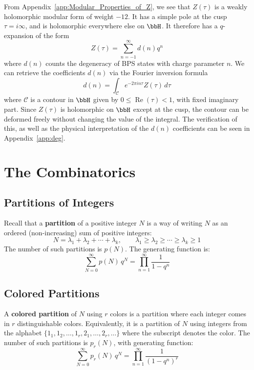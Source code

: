 From Appendix~\ref{app:Modular_Properties_of_Z}, we see that $Z(\tau)$ is a weakly holomorphic modular form of weight $-12$. It has a simple pole at the cusp $\tau = i\infty$, and is holomorphic everywhere else on $\bbH$. It therefore has a $q$-expansion of the form
\begin{equation}
    Z(\tau) = \sum_{n=-1}^{\infty} d(n) q^n
\end{equation}
where $d(n)$ counts the degeneracy of BPS states with charge parameter $n$.
We can retrieve the coefficients $d(n)$ via the Fourier inversion formula
\begin{equation}
    d(n) = \int_{\mathcal{C}} e^{-2\pi i n \tau} Z(\tau) \, d\tau
\end{equation}
where $\mathcal{C}$ is a contour in $\bbH$ given by $0 \le \operatorname{Re}(\tau) < 1$, with fixed imaginary part. Since $Z(\tau)$ is holomorphic on $\bbH$ except at the cusp, the contour can be deformed freely without changing the value of the integral. The verification of this, as well as the physical interpretation of the $d(n)$ coefficients can be seen in Appendix~\ref{app:deg}.

\section{The Combinatorics}

\subsection{Partitions of Integers}

Recall that a \textbf{partition} of a positive integer $N$ is a way of writing 
$N$ as an ordered (non-increasing) sum of positive integers:
\begin{equation}
    N = \lambda_1 + \lambda_2 + \cdots + \lambda_k, \qquad 
    \lambda_1 \geq \lambda_2 \geq \cdots \geq \lambda_k \geq 1
\end{equation}
The number of such partitions is $p(N)$. The generating function is:
\begin{equation}
    \sum_{N=0}^{\infty} p(N)\, q^N = \prod_{n=1}^{\infty} \frac{1}{1-q^n}
\end{equation}

\subsection{Colored Partitions}

A \textbf{colored partition} of $N$ using $r$ colors is a partition where each 
integer comes in $r$ distinguishable colors. Equivalently, it is a partition 
of $N$ using integers from the alphabet $\{1_1, 1_2, \ldots, 1_r, 2_1, \ldots, 2_r, \ldots\}$ 
where the subscript denotes the color. The number of such partitions is $p_r(N)$, 
with generating function:
\begin{equation}
    \sum_{N=0}^{\infty} p_r(N)\, q^N = \prod_{n=1}^{\infty}\frac{1}{(1-q^n)^r}
\end{equation}



